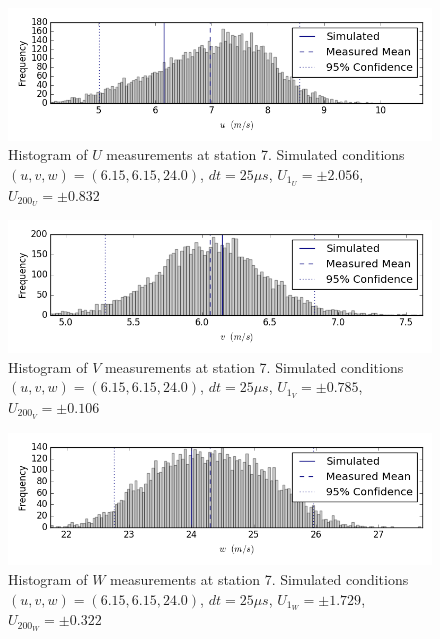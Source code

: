 \begin{figure}[H]
\centering
\includegraphics[width=6in]{figs/Ely_May28th07001/uncertainty_Ely_May28th07001_U}
\caption{Histogram of $U$ measurements at station 7. Simulated conditions $(u,v,w)=(6.15, 6.15, 24.0)$, $dt=25 \mu s$, $U_1_U=\pm 2.056$, $U_200_U=\pm 0.832$}
\label{fig:uncertainty_Ely_May28th07001_U}
\end{figure}


\begin{figure}[H]
\centering
\includegraphics[width=6in]{figs/Ely_May28th07001/uncertainty_Ely_May28th07001_V}
\caption{Histogram of $V$ measurements at station 7. Simulated conditions $(u,v,w)=(6.15, 6.15, 24.0)$, $dt=25 \mu s$, $U_1_V=\pm 0.785$, $U_200_V=\pm 0.106$}
\label{fig:uncertainty_Ely_May28th07001_V}
\end{figure}


\begin{figure}[H]
\centering
\includegraphics[width=6in]{figs/Ely_May28th07001/uncertainty_Ely_May28th07001_W}
\caption{Histogram of $W$ measurements at station 7. Simulated conditions $(u,v,w)=(6.15, 6.15, 24.0)$, $dt=25 \mu s$, $U_1_W=\pm 1.729$, $U_200_W=\pm 0.322$}
\label{fig:uncertainty_Ely_May28th07001_W}
\end{figure}


